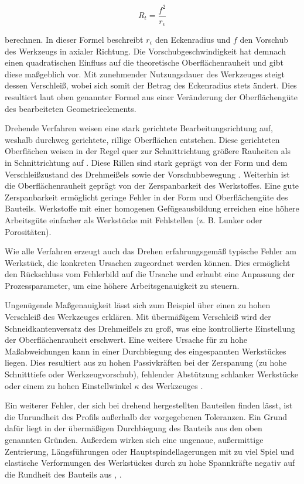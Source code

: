 \begin{equation*}
	R_{t}=\frac{f^{2}}{r_{\epsilon}}
\end{equation*}

berechnen. In dieser Formel beschreibt $r_{\epsilon}$ den Eckenradius und $f$ den Vorschub des Werkzeugs in axialer Richtung. Die Vorschubgeschwindigkeit hat demnach einen quadratischen Einfluss auf die theoretische Oberflächenrauheit und gibt diese maßgeblich vor. Mit zunehmender Nutzungsdauer des Werkzeuges steigt dessen Verschleiß, wobei sich somit der Betrag des Eckenradius stets ändert. Dies resultiert laut oben genannter Formel aus einer Veränderung der Oberflächengüte des bearbeiteten Geometrieelements. 

Drehende Verfahren weisen eine stark gerichtete Bearbeitungsrichtung auf, weshalb durchweg gerichtete, rillige Oberflächen entstehen. Diese gerichteten Oberflächen weisen in der Regel quer zur Schnittrichtung größere Rauheiten als in Schnittrichtung auf \cite{Denkena.2011}.
Diese Rillen sind stark geprägt von der Form und dem Verschleißzustand des Drehmeißels sowie der Vorschubbewegung \cite{Paucksch.2008}.
Weiterhin ist die Oberflächenrauheit geprägt von der Zerspanbarkeit des Werkstoffes. Eine gute Zerspanbarkeit ermöglicht geringe Fehler in der Form und Oberflächengüte des Bauteils. Werkstoffe mit einer homogenen Gefügeausbildung erreichen eine höhere Arbeitsgüte einfacher als Werkstücke mit Fehlstellen (z. B. Lunker oder Porositäten).

Wie alle Verfahren erzeugt auch das Drehen erfahrungsgemäß typische Fehler am Werkstück, die konkreten Ursachen zugeordnet werden können. Dies ermöglicht den Rückschluss vom Fehlerbild auf die Ursache und erlaubt eine Anpassung der Prozessparameter, um eine höhere Arbeitsgenauigkeit zu steuern. 

Ungenügende Maßgenauigkeit lässt sich zum Beispiel über einen zu hohen Verschleiß des Werkzeuges erklären. Mit übermäßigem Verschleiß wird der Schneidkantenversatz des Drehmeißels zu groß, was eine kontrollierte Einstellung der Oberflächenrauheit erschwert. Eine weitere Ursache für zu hohe Maßabweichungen kann in einer Durchbiegung des eingespannten Werkstückes liegen. Dies resultiert aus zu hohen Passivkräften bei der Zerspanung (zu hohe Schnitttiefe oder Werkzeugvorschub), fehlender Abstützung schlanker Werkstücke oder einem zu hohen Einstellwinkel $\kappa$ des Werkzeuges \cite{Schonherr.2002}.

Ein weiterer Fehler, der sich bei drehend hergestellten Bauteilen finden lässt, ist die Unrundheit des Profils außerhalb der vorgegebenen Toleranzen. Ein Grund dafür liegt in der übermäßigen Durchbiegung des Bauteils aus den oben genannten Gründen. Außerdem wirken sich eine ungenaue, außermittige Zentrierung, Längsführungen oder Hauptspindellagerungen mit zu viel Spiel und elastische Verformungen des Werkstückes durch zu hohe Spannkräfte negativ auf die Rundheit des Bauteils aus \cite{Dietrich.2014}, \cite{Schonherr.2002}. 

